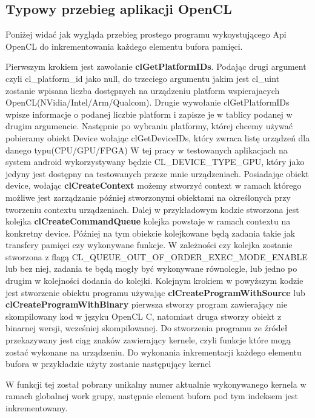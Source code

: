 \subsection{Typowy przebieg aplikacji OpenCL}
Poniżej widać jak wygląda przebieg prostego programu wykoystującego Api OpenCL do inkrementowania każdego elementu bufora pamięci.



Pierwszym krokiem jest zawołanie \textbf{clGetPlatformIDs}. Podając drugi argument czyli cl\_platform\_id\* jako null, do trzeciego argumentu jakim jest cl\_uint\* zostanie wpisana liczba dostępnych na urządzeniu platform wspierajacych OpenCL(NVidia/Intel/Arm/Qualcom).
Drugie wywołanie clGetPlatformIDs wpisze informacje o podanej liczbie platform i zapisze je w tablicy podanej w drugim argumencie.
Następnie po wybraniu platformy, której chcemy używać pobieramy obiekt Device wołając clGetDeviceIDs, który zwraca listę urządzeń dla danego typu(CPU/GPU/FPGA)
W tej pracy w testowanych aplikacjach na system android wykorzystywany będzie CL\_DEVICE\_TYPE\_GPU, który jako jedyny jest dostępny na testowanych przeze mnie urządzeniach.
Posiadając obiekt device, wołając \textbf{clCreateContext} możemy stworzyć context w ramach którego możliwe jest zarządzanie później stworzonymi obiektami na określonych przy tworzeniu contextu urządzeniach.
Dalej w przykładowym kodzie stworzona jest kolejka \textbf{clCreateCommandQueue} kolejka powstaje w ramach contextu na konkretny device. Później na tym obiekcie kolejkowane będą zadania takie jak transfery pamięci czy wykonywane funkcje. W zależności czy kolejka zostanie stworzona z flagą CL\_QUEUE\_OUT\_OF\_ORDER\_EXEC\_MODE\_ENABLE lub bez niej, zadania te będą mogły być wykonywane równolegle, lub jedno po drugim w kolejności dodania do kolejki.
Kolejnym krokiem w powyższym kodzie jest stworzenie obiektu programu używając \textbf{clCreateProgramWithSource} lub \textbf{clCreateProgramWithBinary} pierwsza stworzy program zawierający nie skompilowany kod w języku OpenCL C, natomiast druga stworzy obiekt z binarnej wersji, wcześniej skompilowanej. Do stworzenia programu ze źródeł przekazywany jest ciąg znaków zawierający kernele, czyli funkcje które mogą zostać wykonane na urządzeniu.
Do wykonania inkrementacji każdego elementu bufora w przykładzie użyty zostanie następujący kernel

W funkcji tej został pobrany unikalny numer aktualnie wykonywanego kernela w ramach globalnej work grupy, następnie element bufora pod tym indeksem jest inkrementowany. 
